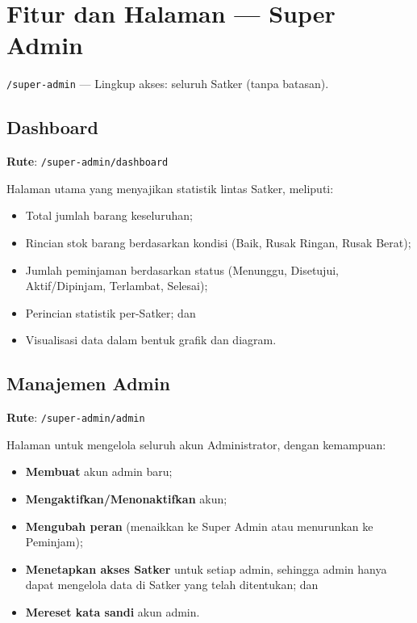 \documentclass[
  12pt,
  a4paper,
  oneside,
  final
]{report}
\begin{document}
\chapter{Fitur dan Halaman --- Super Admin}

\verb|/super-admin| --- Lingkup akses: seluruh Satker (tanpa batasan).

\section{Dashboard}
\textbf{Rute}: \texttt{/super-admin/dashboard}

Halaman utama yang menyajikan statistik lintas Satker, meliputi:
\begin{itemize}
  \item Total jumlah barang keseluruhan;
  \item Rincian stok barang berdasarkan kondisi (Baik, Rusak Ringan,
        Rusak Berat);
  \item Jumlah peminjaman berdasarkan status (Menunggu, Disetujui,
        Aktif/Dipinjam, Terlambat, Selesai);
  \item Perincian statistik per-Satker; dan
  \item Visualisasi data dalam bentuk grafik dan diagram.
\end{itemize}

\section{Manajemen Admin}
\textbf{Rute}: \texttt{/super-admin/admin}

Halaman untuk mengelola seluruh akun Administrator, dengan kemampuan:
\begin{itemize}
  \item {\bfseries Membuat} akun admin baru;
  \item {\bfseries Mengaktifkan/Menonaktifkan} akun;
  \item {\bfseries Mengubah peran} (menaikkan ke Super Admin atau
        menurunkan ke Peminjam);
  \item {\bfseries Menetapkan akses Satker} untuk setiap admin,
        sehingga admin hanya dapat mengelola data di Satker
        yang telah ditentukan; dan
  \item {\bfseries Mereset kata sandi} akun admin.
\end{itemize}
\end{document}
